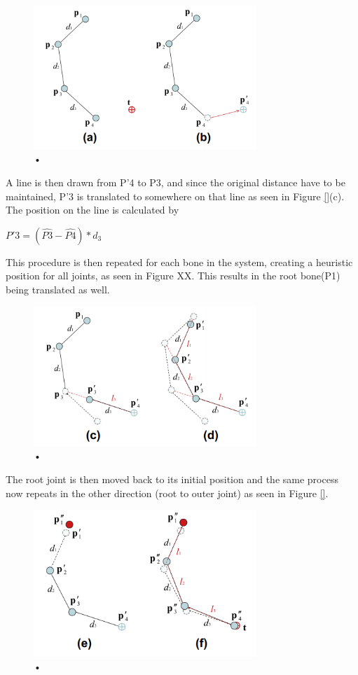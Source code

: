 \begin{figure}[hbtp]
\centering
\includegraphics[width=0.75\textwidth]{fabrik/ab}
\caption{•}
\end{figure}

A line is then drawn from P'4 to P3, and since the original distance have to be maintained, P'3 is translated to somewhere on that line as seen in Figure \ref{}(c). The position on the line is calculated by 

$P'3 = (\hat{P3} - \hat{P4}) * d_{3}$

This procedure is then repeated for each bone in the system, creating a heuristic position for all joints, as seen in Figure XX. This results in the root bone(P1) being translated as well. 

\begin{figure}[hbtp]
\centering
\includegraphics[width=0.75\textwidth]{fabrik/cd}
\caption{•}
\end{figure}

The root joint is then moved back to its initial position and the same process now repeats in the other direction (root to outer joint) as seen in Figure \ref{}.

\begin{figure}[hbtp]
 \centering
 \includegraphics[width=0.75\textwidth]{fabrik/ef}
 \caption{•}
 \end{figure}
  
